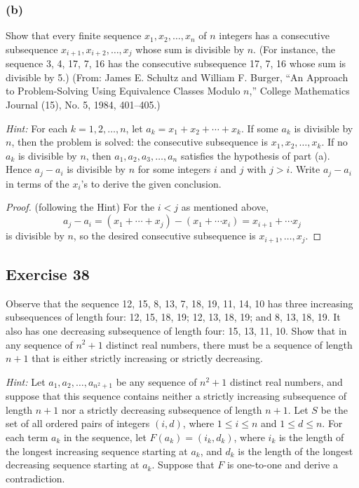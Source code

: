 \documentclass[14pt]{extarticle}
\begin{document}
\subsubsection{(b)}
Show that every finite sequence \(x_1, x_2, \ldots, x_n\) of \(n\) integers has a consecutive subsequence 
\(x_{i+1}, x_{i+2}, \ldots, x_j\) whose sum is divisible by \(n\). (For instance, the sequence 3, 4, 17, 7, 16 has the 
consecutive subsequence 17, 7, 16 whose sum is divisible by 5.) (From: James E. Schultz and William F. Burger, “An 
Approach to Problem-Solving Using Equivalence Classes Modulo \(n\),” College Mathematics Journal (15), No. 5, 
1984, 401–405.)

{\it Hint:} For each \(k = 1, 2, \ldots, n\), let \(a_k = x_1 + x_2 + \cdots + x_k\). If some \(a_k\) is divisible by 
\(n\), then the problem is solved: the consecutive subsequence is \(x_1, x_2, \ldots, x_k\). If no \(a_k\) is 
divisible by \(n\), then \(a_1, a_2, a_3, \ldots, a_n\) satisfies the hypothesis of part (a). Hence \(a_j - a_i\) 
is divisible by \(n\) for some integers \(i\) and \(j\) with \(j > i\). Write \(a_j - a_i\) in terms of the 
\(x_i\)’s to derive the given conclusion.

\begin{proof}
(following the Hint) For the \(i < j\) as mentioned above,
\[
a_j - a_i = (x_1 + \cdots + x_j) - (x_1 + \cdots x_i) = x_{i+1} + \cdots x_j
\]
is divisible by \(n\), so the desired consecutive subsequence is \(x_{i+1}, \ldots, x_j\).
\end{proof}

\subsection{Exercise 38}
Observe that the sequence 12, 15, 8, 13, 7, 18, 19, 11, 14, 10 has three increasing subsequences of length four: 12, 
15, 18, 19; 12, 13, 18, 19; and 8, 13, 18, 19. It also has one decreasing subsequence of length four: 15, 13, 11, 10. 
Show that in any sequence of \(n^2 + 1\) distinct real numbers, there must be a sequence of length \(n + 1\) that 
is either strictly increasing or strictly decreasing.

{\it Hint:} Let \(a_1, a_2, \ldots, a_{n^2+1}\) be any sequence of \(n^2 + 1\) distinct real numbers, and suppose 
that this sequence contains neither a strictly increasing subsequence of length \(n + 1\) nor a strictly decreasing 
subsequence of length \(n + 1\). Let \(S\) be the set of all ordered pairs of integers \((i, d)\), where \(1 \leq i 
\leq n\) and \(1 \leq d \leq n\). For each term \(a_k\) in the sequence, let \(F(a_k) = (i_k, d_k)\), where \(i_k\) is 
the length of the longest increasing sequence starting at \(a_k\), and \(d_k\) is the length of the longest decreasing 
sequence starting at \(a_k\). Suppose that \(F\) is one-to-one and derive a contradiction.
\end{document}
